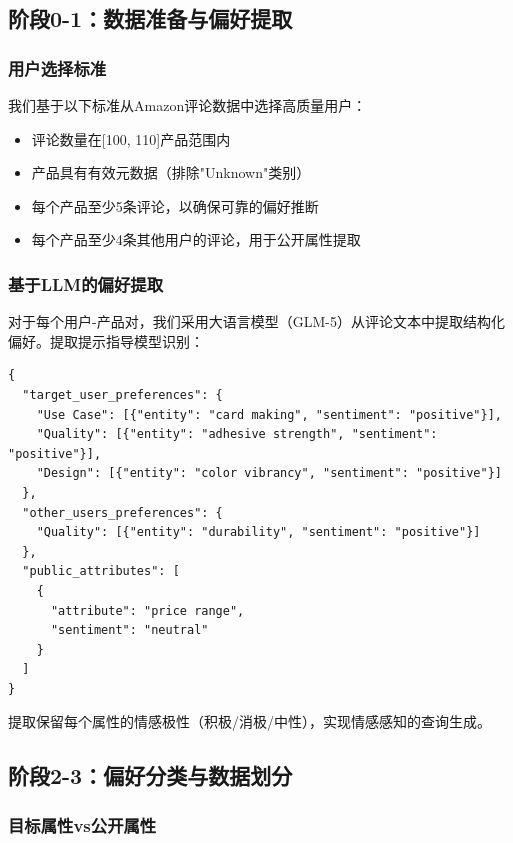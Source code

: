 \documentclass[11pt,a4paper]{article}
\begin{document}
\subsection{阶段0-1：数据准备与偏好提取}

\subsubsection{用户选择标准}

我们基于以下标准从Amazon评论数据中选择高质量用户：
\begin{itemize}
    \item 评论数量在[100, 110]产品范围内
    \item 产品具有有效元数据（排除"Unknown"类别）
    \item 每个产品至少5条评论，以确保可靠的偏好推断
    \item 每个产品至少4条其他用户的评论，用于公开属性提取
\end{itemize}

\subsubsection{基于LLM的偏好提取}

对于每个用户-产品对，我们采用大语言模型（GLM-5）从评论文本中提取结构化偏好。提取提示指导模型识别：

\begin{verbatim}
{
  "target_user_preferences": {
    "Use Case": [{"entity": "card making", "sentiment": "positive"}],
    "Quality": [{"entity": "adhesive strength", "sentiment": "positive"}],
    "Design": [{"entity": "color vibrancy", "sentiment": "positive"}]
  },
  "other_users_preferences": {
    "Quality": [{"entity": "durability", "sentiment": "positive"}]
  },
  "public_attributes": [
    {
      "attribute": "price range",
      "sentiment": "neutral"
    }
  ]
}
\end{verbatim}

提取保留每个属性的情感极性（积极/消极/中性），实现情感感知的查询生成。

\subsection{阶段2-3：偏好分类与数据划分}

\subsubsection{目标属性vs公开属性}
\end{document}
